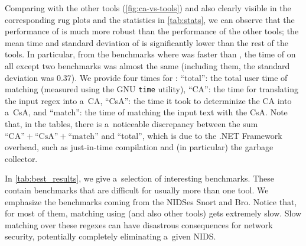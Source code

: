 \documentclass[acmsmall,screen]{acmart}
\begin{document}


Comparing with the other tools (\cref{fig:ca-vs-tools}) and also clearly visible 
in the corresponding rug plots and the statistics in
\cref{tab:stats},
we can observe that the performance of \catool is much more robust than
the performance of the other tools;
the mean time and standard deviation of \catool is significantly lower than the
rest of the tools.
In particular, from the benchmarks where \catool was faster than \retwo, the
time of \catool on all except two benchmarks was almost the same (including
them, the standard deviation was 0.37).
We provide four times for \catool:
``total'': the total user time of matching (measured using the GNU \texttt{time} utility),
``CA'': the time for translating the input regex into a~CA,
``CsA'': the time it took to determinize the CA into a~CsA, and
``match'': the time of matching the input text with the CsA.
Note that, in the tables, there is a~noticeable discrepancy between the sum
$\text{``CA''} + \text{``CsA''} + \text{``match''}$ and ``total'', which is
due to the .NET Framework overhead, such as just-in-time compilation and (in
particular) the garbage collector.

In \cref{tab:best_results}, we give a~selection of interesting benchmarks.
These contain benchmarks that are difficult for usually more than one tool.
We emphasize the benchmarks coming from the NIDSes Snort and Bro.
Notice that, for most of them, matching using \retwo (and also other tools) gets
extremely slow.
Slow matching over these regexes can have disastrous consequences for network
security, potentially completely eliminating a~given NIDS.

\newcommand{\LF}{Sw}

\newcommand{\interestingtable}[0]{
\begin{table}[t]
\footnotesize
\caption{Selection of interesting benchmarks. ``\timeout'' denotes a~timeout
(600\,s) and ``---'' denotes an error.
Due to space constraints, in the ``Regex'' column, ``\ldots'' denotes omitted
parts of the regexes (we tried to preserve the parts containing occurrences of
  the repetition operator) and
``\recont'' denotes breaking a regex into two lines. 
In the column source, \LF\ denotes the regexes collected in \cite{DavisMCSL19} from software projects. 
}
\label{tab:best_results}
\vspace*{-2.5mm}
\begin{center}

\end{center}
\vspace*{-2.0mm}
\end{table}
}
\end{document}
